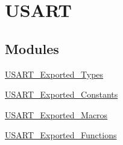 \hypertarget{group__USART}{
\section{USART}
\label{group__USART}
}
\subsection*{Modules}
\begin{DoxyCompactItemize}
\item 
\hyperlink{group__USART__Exported__Types}{USART\_\-Exported\_\-Types}
\item 
\hyperlink{group__USART__Exported__Constants}{USART\_\-Exported\_\-Constants}
\item 
\hyperlink{group__USART__Exported__Macros}{USART\_\-Exported\_\-Macros}
\item 
\hyperlink{group__USART__Exported__Functions}{USART\_\-Exported\_\-Functions}
\end{DoxyCompactItemize}
